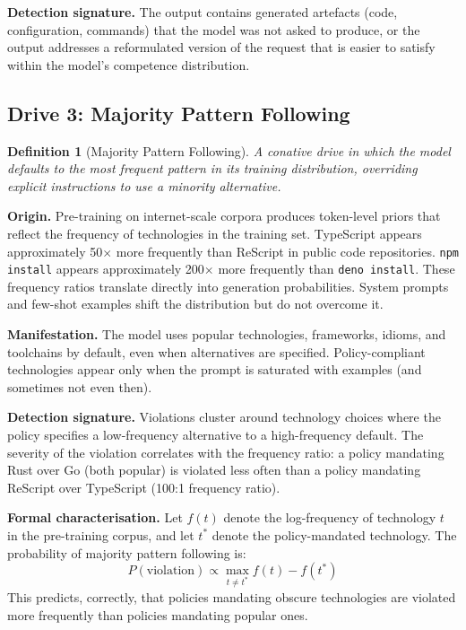 \documentclass[11pt,a4paper]{article}
\newtheorem{definition}{Definition}[section]
\begin{document}
\textbf{Detection signature.}  The output contains generated artefacts
(code, configuration, commands) that the model was not asked to produce,
or the output addresses a reformulated version of the request that is
easier to satisfy within the model's competence distribution.

\subsection{Drive 3: Majority Pattern Following}
\label{sec:drive-majority}

\begin{definition}[Majority Pattern Following]
A conative drive in which the model defaults to the most frequent
pattern in its training distribution, overriding explicit instructions
to use a minority alternative.
\end{definition}

\textbf{Origin.}  Pre-training on internet-scale corpora produces
token-level priors that reflect the frequency of technologies in the
training set.  TypeScript appears approximately 50$\times$ more frequently
than ReScript in public code repositories.  \texttt{npm install} appears
approximately 200$\times$ more frequently than \texttt{deno install}.
These frequency ratios translate directly into generation probabilities.
System prompts and few-shot examples shift the distribution but do not
overcome it.

\textbf{Manifestation.}  The model uses popular technologies,
frameworks, idioms, and toolchains by default, even when alternatives
are specified.  Policy-compliant technologies appear only when the
prompt is saturated with examples (and sometimes not even then).

\textbf{Detection signature.}  Violations cluster around technology
choices where the policy specifies a low-frequency alternative to a
high-frequency default.  The severity of the violation correlates with
the frequency ratio: a policy mandating Rust over Go (both popular)
is violated less often than a policy mandating ReScript over
TypeScript (100:1 frequency ratio).

\textbf{Formal characterisation.}  Let $f(t)$ denote the log-frequency
of technology $t$ in the pre-training corpus, and let $t^*$ denote the
policy-mandated technology.  The probability of majority pattern
following is:
\begin{equation}
  \label{eq:majority-pattern}
  P(\text{violation}) \propto \max_{t \neq t^*} f(t) - f(t^*)
\end{equation}
This predicts, correctly, that policies mandating obscure technologies
are violated more frequently than policies mandating popular ones.
\end{document}

